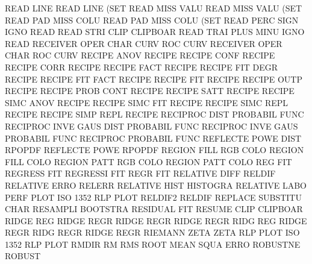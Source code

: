 READ     LINE                           READ     LINE (SET
READ     MISS VALU                      READ     MISS VALU (SET
READ     PAD  MISS COLU                 READ     PAD  MISS COLU (SET
READ     PERC SIGN IGNO                 READ
READ     STRI CLIP                      CLIPBOAR
READ     TRAI PLUS MINU IGNO            READ
RECEIVER OPER CHAR CURV                 ROC      CURV
RECEIVER OPER CHAR                      ROC      CURV
RECIPE   ANOV                           RECIPE
RECIPE   CONF                           RECIPE
RECIPE   CORR                           RECIPE
RECIPE   FACT                           RECIPE
RECIPE   FIT  DEGR                      RECIPE
RECIPE   FIT  FACT                      RECIPE
RECIPE   FIT                            RECIPE
RECIPE   OUTP                           RECIPE
RECIPE   PROB CONT                      RECIPE
RECIPE   SATT                           RECIPE
RECIPE   SIMC ANOV                      RECIPE
RECIPE   SIMC FIT                       RECIPE
RECIPE   SIMC REPL                      RECIPE
RECIPE   SIMP REPL                      RECIPE
RECIPROC DIST                           PROBABIL FUNC
RECIPROC INVE GAUS DIST                 PROBABIL FUNC
RECIPROC INVE GAUS                      PROBABIL FUNC
RECIPROC                                PROBABIL FUNC
REFLECTE POWE DIST                      RPOPDF
REFLECTE POWE                           RPOPDF
REGION   FILL RGB  COLO                 REGION   FILL COLO
REGION   PATT RGB  COLO                 REGION   PATT COLO
REG                                     FIT
REGRESS                                 FIT
REGRESSI                                FIT
REGR                                    FIT
RELATIVE DIFF                           RELDIF
RELATIVE ERRO                           RELERR
RELATIVE HIST                           HISTOGRA
RELATIVE LABO PERF PLOT                 ISO      1352 RLP  PLOT
RELDIF2                                 RELDIF
REPLACE                                 SUBSTITU CHAR
RESAMPLI                                BOOTSTRA
RESIDUAL                                FIT
RESUME   CLIP                           CLIPBOAR
RIDGE    REG                            RIDGE    REGR
RIDGE    REGR                           RIDGE    REGR
RIDG     REG                            RIDGE    REGR
RIDG     REGR                           RIDGE    REGR
RIEMANN  ZETA                           ZETA
RLP      PLOT                           ISO      1352 RLP  PLOT
RMDIR                                   RM
RMS                                     ROOT     MEAN SQUA ERRO
ROBUSTNE                                ROBUST
